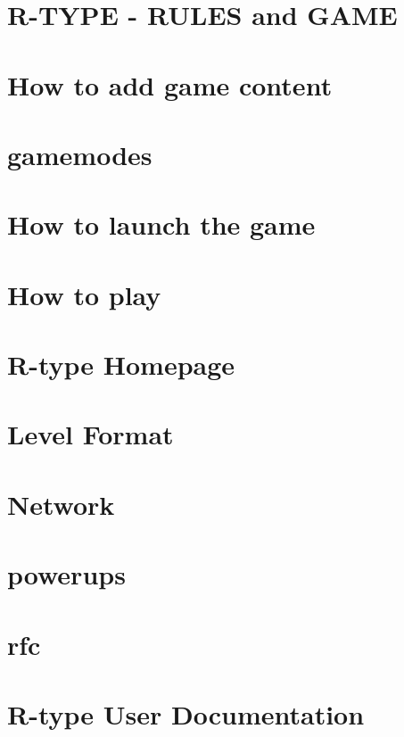 \let\mypdfximage\pdfximage\def\pdfximage{\immediate\mypdfximage}\documentclass[twoside]{book}
\newcommand{\+}{\discretionary{\mbox{\scriptsize$\hookleftarrow$}}{}{}}
\begin{document}
\chapter{R-\/\+TYPE -\/ RULES and GAME}
\label{md_Game}

\chapter{How to add game content}
\label{md_gamecontent}

\chapter{gamemodes}
\label{md_gamemodes}

\chapter{How to launch the game}
\label{md_HowToLaunchTheGame}

\chapter{How to play}
\label{md_HowToPlay}

\chapter{R-\/type Homepage}
\label{md_index}

\chapter{Level Format}
\label{md_level_as_file}

\chapter{Network}
\label{md_network}

\chapter{powerups}
\label{md_powerups}

\chapter{rfc}
\label{md_rfc}

\chapter{R-\/type User Documentation}
\label{md_userdoc}

\end{document}
